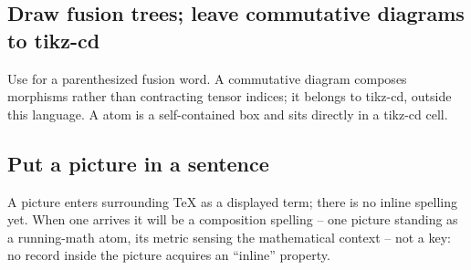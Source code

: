 \subsection{Draw fusion trees; leave commutative diagrams to tikz-cd}

Use  for a parenthesized fusion word.  A commutative diagram
composes morphisms rather than contracting tensor indices; it belongs to
tikz-cd, outside this language.  A  atom is a self-contained
box and sits directly in a tikz-cd cell.

\subsection{Put a picture in a sentence}

A picture enters surrounding TeX as a displayed term; there is no inline
spelling yet.  When one arrives it will be a composition spelling -- one
picture standing as a running-math atom, its metric sensing the
mathematical context -- not a key: no record inside the picture acquires
an ``inline'' property.
